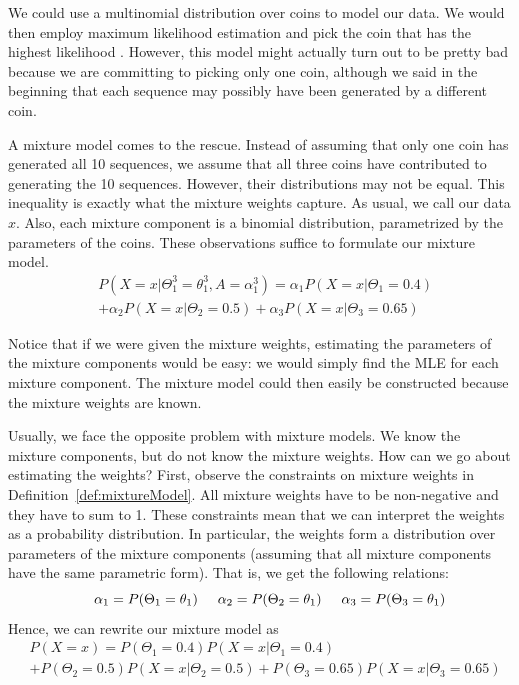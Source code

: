 We could use 
a multinomial distribution over coins to model our data. We would then employ maximum likelihood estimation 
and pick the coin that has the highest likelihood . However, this model might actually turn out to be
pretty bad because we are committing to picking only one coin, although we said in the beginning that
each sequence may possibly have been generated by a different coin. 

A mixture model comes to the rescue. Instead of assuming that only one coin has generated all 10 sequences,
we assume that all three coins have contributed to generating the 10 sequences. However, their distributions
may not be equal. This inequality is exactly what the mixture weights capture. As usual, we call our data $ x $. Also, each mixture component is a binomial distribution, parametrized by the parameters of
the coins. These observations suffice to formulate our mixture model.
\begin{align}\label{eq:mixtureExample}
&P(X=x|\Theta_{1}^{3}=\theta_{1}^{3}, A = \alpha_{1}^{3}) 
= \alpha_{1}P(X=x|\Theta_{1}=0.4) \\
&+ \alpha_{2}P(X=x|\Theta_{2}=0.5) + \alpha_{3}P(X=x|\Theta_{3}=0.65) \nonumber
\end{align}

Notice that if we were given the mixture weights, estimating
the parameters of the mixture components would be easy: we would simply find the MLE for each mixture component. The mixture
model could then easily be constructed because the mixture weights are known. 

Usually, we face the opposite problem with mixture models. We know the mixture components, but do not know the mixture weights.
How can we go about estimating the weights? First, observe the constraints
on mixture weights in Definition~\ref{def:mixtureModel}. All mixture weights have to be non-negative and they have to sum to 1.
These constraints mean that we can interpret the weights as a probability distribution. In particular, the weights form a distribution over parameters
of the mixture components (assuming that all mixture components have the same parametric form). That is, we get the following
relations:
\begin{equation}
\hskip 0.5cm \alpha_{1} = P(\Theta_{1} = \theta_{1}) \hskip 0.5cm \alpha_{2} = P(\Theta_{2} = \theta_{1}) \hskip 0.5cm \alpha_{3} = P(\Theta_{3} = \theta_{1})
\end{equation}
Hence, we can rewrite our mixture model as
\begin{align} \label{eq:probabilisticMixtureModel}
&P(X=x) 
= P(\Theta_{1} = 0.4)P(X=x|\Theta_{1}=0.4) \\
&+ P(\Theta_{2} = 0.5)P(X=x|\Theta_{2}=0.5) + P(\Theta_{3} = 0.65)P(X=x|\Theta_{3}=0.65) \nonumber
\end{align}

